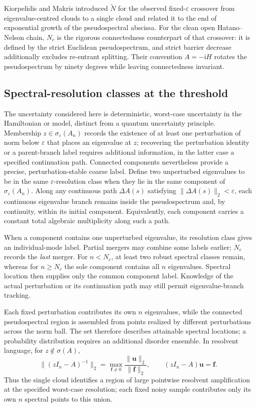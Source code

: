 \documentclass[12pt,anonymous]{iopjournal}
\numberwithin{equation}{section}
\theoremstyle{remark}
\newcommand{\ii}{\mathrm i}
\begin{document}
Kiorpelidis and Makris \cite{KiorpelidisMakris2025} introduced
\(\widetilde N\) for the observed fixed-\(\varepsilon\) crossover from
eigenvalue-centred clouds to a single cloud and related it to the end of
exponential growth of the pseudospectral abscissa.  For the clean open
Hatano--Nelson chain, \(N_c\) is the rigorous connectedness counterpart of
that crossover: it is defined by the strict Euclidean pseudospectrum, and
strict barrier decrease additionally excludes re-entrant splitting.  Their
convention \(A=-\ii H\) rotates the pseudospectrum by ninety degrees while
leaving connectedness invariant.

\subsection{Spectral-resolution classes at the threshold}

The uncertainty considered here is deterministic, worst-case uncertainty in
the Hamiltonian or model, distinct from a quantum uncertainty principle.
Membership \(z\in\sigma_\varepsilon(A_n)\) records the existence of at least one
perturbation of norm below \(\varepsilon\) that places an eigenvalue at
\(z\); recovering the perturbation identity or a parent-branch label
requires additional information, in the latter case a specified
continuation path.  Connected components nevertheless provide a precise,
perturbation-stable coarse label.  Define two unperturbed eigenvalues to be
in the same \(\varepsilon\)-resolution class when they lie in the same
component of \(\sigma_\varepsilon(A_n)\).  Along any continuous path
\(\Delta A(s)\) satisfying \(\lVert\Delta A(s)\rVert_2<\varepsilon\), each
continuous eigenvalue branch remains inside the pseudospectrum and, by
continuity, within its initial component.  Equivalently, each component
carries a constant total algebraic multiplicity along such a path.

When a component contains one unperturbed eigenvalue, its resolution class
gives an individual-mode label.  Partial mergers may combine some labels
earlier; \(N_c\) records the \emph{last} merger.  For \(n<N_c\), at least two
robust spectral classes remain, whereas for \(n\geq N_c\) the sole component
contains all \(n\) eigenvalues.  Spectral location then supplies only the
common component label.  Knowledge of the actual perturbation or its
continuation path may still permit eigenvalue-branch tracking.

Each fixed perturbation contributes its own \(n\) eigenvalues, while the
connected pseudospectral region is assembled from points realized by
different perturbations across the norm ball.  The set therefore describes
attainable spectral locations; a probability distribution requires an
additional disorder ensemble.  In resolvent language, for
\(z\notin\sigma(A)\),
\[
 \lVert(zI_n-A)^{-1}\rVert_2
 =\max_{\boldsymbol f\neq0}
 \frac{\lVert\boldsymbol u\rVert_2}{\lVert\boldsymbol f\rVert_2},
 \qquad (zI_n-A)\boldsymbol u=\boldsymbol f.
\]
Thus the single cloud identifies a region of large pointwise resolvent
amplification at the specified worst-case resolution; each fixed noisy
sample contributes only its own \(n\) spectral points to this union.
\end{document}
